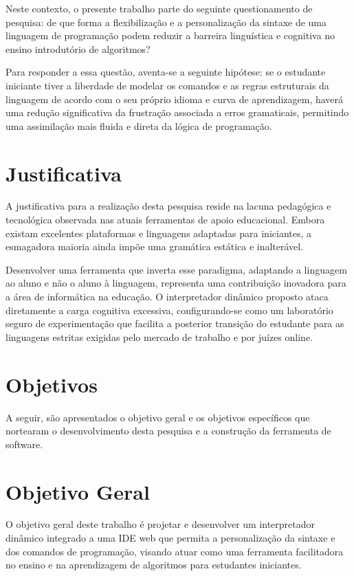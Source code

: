 Neste contexto, o presente trabalho parte do seguinte questionamento de pesquisa: de que forma a flexibilização e a personalização da sintaxe de uma linguagem de programação podem reduzir a barreira linguística e cognitiva no ensino introdutório de algoritmos?

Para responder a essa questão, aventa-se a seguinte hipótese: se o estudante iniciante tiver a liberdade de modelar os comandos e as regras estruturais da linguagem de acordo com o seu próprio idioma e curva de aprendizagem, haverá uma redução significativa da frustração associada a erros gramaticais, permitindo uma assimilação mais fluida e direta da lógica de programação.

\section{Justificativa}

A justificativa para a realização desta pesquisa reside na lacuna pedagógica e tecnológica observada nas atuais ferramentas de apoio educacional. Embora existam excelentes plataformas e linguagens adaptadas para iniciantes, a esmagadora maioria ainda impõe uma gramática estática e inalterável. 

Desenvolver uma ferramenta que inverta esse paradigma, adaptando a linguagem ao aluno e não o aluno à linguagem, representa uma contribuição inovadora para a área de informática na educação. O interpretador dinâmico proposto ataca diretamente a carga cognitiva excessiva, configurando-se como um laboratório seguro de experimentação que facilita a posterior transição do estudante para as linguagens estritas exigidas pelo mercado de trabalho e por juízes online.

\section{Objetivos}

A seguir, são apresentados o objetivo geral e os objetivos específicos que nortearam o desenvolvimento desta pesquisa e a construção da ferramenta de software.

\section{Objetivo Geral}

O objetivo geral deste trabalho é projetar e desenvolver um interpretador dinâmico integrado a uma IDE web que permita a personalização da sintaxe e dos comandos de programação, visando atuar como uma ferramenta facilitadora no ensino e na aprendizagem de algoritmos para estudantes iniciantes.

